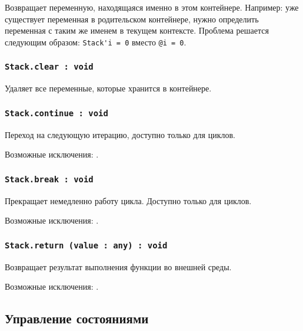 Возвращает переменную, находящаяся именно в этом контейнере. Например: уже существует переменная  в родительском контейнере, нужно определить переменная с таким же именем в текущем контексте. Проблема решается следующим образом: \lstinline|Stack'i = 0| вместо \lstinline|@i = 0|.

\subsubsection{\lstinline|Stack.clear : void|}

Удаляет все переменные, которые хранится в контейнере.

\subsubsection{\lstinline|Stack.continue : void|}

Переход на следующую итерацию, доступно только для циклов.

Возможные исключения: .

\subsubsection{\lstinline|Stack.break : void|}

Прекращает немедленно работу цикла. Доступно только для циклов.

Возможные исключения: .

\subsubsection{\lstinline|Stack.return (value : any) : void|}

Возвращает результат выполнения функции во внешней среды.

Возможные исключения: .

\subsection{Управление состояниями}

